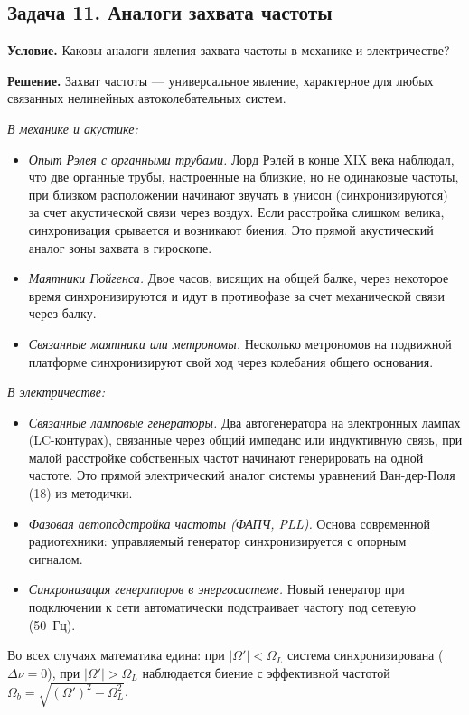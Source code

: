 \documentclass[12pt, a4paper]{article}
\begin{document}
\subsection*{Задача 11. Аналоги захвата частоты}

\textbf{Условие.} Каковы аналоги явления захвата частоты в механике и электричестве?

\textbf{Решение.} Захват частоты --- универсальное явление, характерное для любых связанных нелинейных автоколебательных систем.

\textit{В механике и акустике:}
\begin{itemize}[leftmargin=1.5em]
    \item \textit{Опыт Рэлея с органными трубами.} Лорд Рэлей в конце XIX века наблюдал, что две органные трубы, настроенные на близкие, но не одинаковые частоты, при близком расположении начинают звучать в унисон (синхронизируются) за счет акустической связи через воздух. Если расстройка слишком велика, синхронизация срывается и возникают биения. Это прямой акустический аналог зоны захвата в гироскопе.
    \item \textit{Маятники Гюйгенса.} Двое часов, висящих на общей балке, через некоторое время синхронизируются и идут в противофазе за счет механической связи через балку.
    \item \textit{Связанные маятники или метрономы.} Несколько метрономов на подвижной платформе синхронизируют свой ход через колебания общего основания.
\end{itemize}

\textit{В электричестве:}
\begin{itemize}[leftmargin=1.5em]
    \item \textit{Связанные ламповые генераторы.} Два автогенератора на электронных лампах (LC-контурах), связанные через общий импеданс или индуктивную связь, при малой расстройке собственных частот начинают генерировать на одной частоте. Это прямой электрический аналог системы уравнений Ван-дер-Поля (18) из методички.
    \item \textit{Фазовая автоподстройка частоты (ФАПЧ, PLL).} Основа современной радиотехники: управляемый генератор синхронизируется с опорным сигналом.
    \item \textit{Синхронизация генераторов в энергосистеме.} Новый генератор при подключении к сети автоматически подстраивает частоту под сетевую (50~Гц).
\end{itemize}

Во всех случаях математика едина: при $|\Omega'| < \Omega_L$ система синхронизирована ($\Delta\nu = 0$), при $|\Omega'| > \Omega_L$ наблюдается биение с эффективной частотой $\Omega_b = \sqrt{(\Omega')^2 - \Omega_L^2}$.
\end{document}
